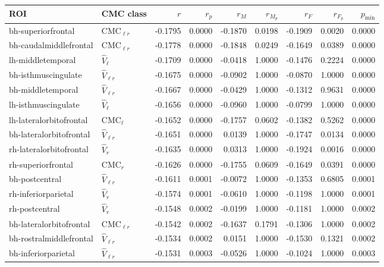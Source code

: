 \documentclass{article}
\begin{document}
\begin{table}
\centering
\begin{tabular}{llrrrrrrr}
	\toprule
	ROI & CMC class & $r$ & $r_p$ & $r_M$ & $r_{M_p}$ & $r_F$ & $r_{F_p}$ & $p_{\min}$ \\
	\midrule
	bh-superiorfrontal & $\text{CMC}_{\ell r}$ & -0.1795 & 0.0000 & -0.1870 & 0.0198 & -0.1909 & 0.0020 & 0.0000 \\
	bh-caudalmiddlefrontal & $\text{CMC}_{\ell r}$ & -0.1778 & 0.0000 & -0.1848 & 0.0249 & -0.1649 & 0.0389 & 0.0000 \\
	lh-middletemporal & $\hat{V}_{\ell}$ & -0.1709 & 0.0000 & -0.0418 & 1.0000 & -0.1476 & 0.2224 & 0.0000 \\
	bh-isthmuscingulate & $\hat{V}_{\ell r}$ & -0.1675 & 0.0000 & -0.0902 & 1.0000 & -0.0870 & 1.0000 & 0.0000 \\
	bh-middletemporal & $\hat{V}_{\ell r}$ & -0.1667 & 0.0000 & -0.0429 & 1.0000 & -0.1312 & 0.9631 & 0.0000 \\
	lh-isthmuscingulate & $\hat{V}_{\ell}$ & -0.1656 & 0.0000 & -0.0960 & 1.0000 & -0.0799 & 1.0000 & 0.0000 \\
	lh-lateralorbitofrontal & $\text{CMC}_{\ell}$ & -0.1652 & 0.0000 & -0.1757 & 0.0602 & -0.1382 & 0.5262 & 0.0000 \\
	bh-lateralorbitofrontal & $\hat{V}_{\ell r}$ & -0.1651 & 0.0000 & 0.0139 & 1.0000 & -0.1747 & 0.0134 & 0.0000 \\
	rh-lateralorbitofrontal & $\hat{V}_{r}$ & -0.1635 & 0.0000 & 0.0313 & 1.0000 & -0.1924 & 0.0016 & 0.0000 \\
	rh-superiorfrontal & $\text{CMC}_r$ & -0.1626 & 0.0000 & -0.1755 & 0.0609 & -0.1649 & 0.0391 & 0.0000 \\
	bh-postcentral & $\hat{V}_{\ell r}$ & -0.1611 & 0.0001 & -0.0072 & 1.0000 & -0.1353 & 0.6805 & 0.0001 \\
	rh-inferiorparietal & $\hat{V}_{r}$ & -0.1574 & 0.0001 & -0.0610 & 1.0000 & -0.1198 & 1.0000 & 0.0001 \\
	rh-postcentral & $\hat{V}_{r}$ & -0.1548 & 0.0002 & -0.0199 & 1.0000 & -0.1181 & 1.0000 & 0.0002 \\
	bh-lateralorbitofrontal & $\text{CMC}_{\ell r}$ & -0.1542 & 0.0002 & -0.1637 & 0.1791 & -0.1306 & 1.0000 & 0.0002 \\
	bh-rostralmiddlefrontal & $\hat{V}_{\ell r}$ & -0.1534 & 0.0002 & 0.0151 & 1.0000 & -0.1530 & 0.1321 & 0.0002 \\
	bh-inferiorparietal & $\hat{V}_{\ell r}$ & -0.1531 & 0.0003 & -0.0526 & 1.0000 & -0.1024 & 1.0000 & 0.0003 \\

\end{tabular}
\end{table}
\end{document}
